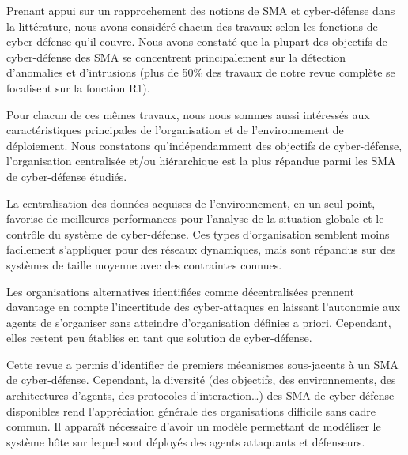 Prenant appui sur un rapprochement des notions de SMA et cyber-défense dans la littérature, nous avons considéré chacun des travaux selon les fonctions de cyber-défense qu'il couvre.
Nous avons constaté que la plupart des objectifs de cyber-défense des SMA se concentrent principalement sur la détection d'anomalies et d'intrusions (plus de 50\% des travaux de notre revue complète se focalisent sur la fonction R1).

Pour chacun de ces mêmes travaux, nous nous sommes aussi intéressés aux caractéristiques principales de l'organisation et de l'environnement de déploiement.
Nous constatons qu'indépendamment des objectifs de cyber-défense, l'organisation centralisée et/ou hiérarchique est la plus répandue parmi les SMA de cyber-défense étudiés.

\noindent

La centralisation des données acquises de l'environnement, en un seul point, favorise de meilleures performances pour l'analyse de la situation globale et le contrôle du système de cyber-défense. Ces types d'organisation semblent moins facilement s'appliquer pour des réseaux dynamiques, mais sont répandus sur des systèmes de taille moyenne avec des contraintes connues\cite{vasilomanolakis2015taxonomy}.

\noindent


Les organisations alternatives identifiées comme décentralisées prennent davantage en compte l'incertitude des cyber-attaques en laissant l'autonomie aux agents de s'organiser sans atteindre d'organisation définies a priori. Cependant, elles restent peu établies en tant que solution de cyber-défense.


Cette revue a permis d'identifier de premiers mécanismes sous-jacents à un SMA de cyber-défense. Cependant, la diversité (des objectifs, des environnements, des architectures d'agents, des protocoles d'interaction\dots) des SMA de cyber-défense disponibles rend l'appréciation générale des organisations difficile sans cadre commun.
Il apparaît nécessaire d'avoir un modèle permettant de modéliser le système hôte sur lequel sont déployés des agents attaquants et défenseurs.

